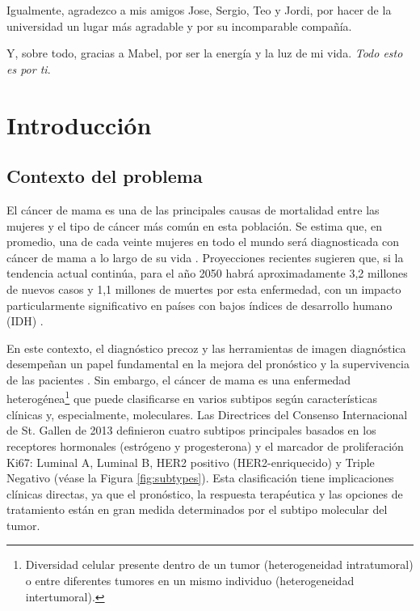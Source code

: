 \documentclass[a4paper,10pt]{book}
\begin{document}
Igualmente, agradezco a mis amigos Jose, Sergio, Teo y Jordi, por hacer de la universidad un lugar más agradable y por su incomparable compañía.

Y, sobre todo, gracias a Mabel, por ser la energía y la luz de mi vida. \textit{Todo esto es por ti}.

 \setcounter{page}{0}
\let\cleardoublepage\clearpage
\tableofcontents
\newpage \thispagestyle{empty}

\listoffigures
\listoftables


\pagestyle{fancy}
\newpage \thispagestyle{empty}


\mainmatter
\chapter{Introducción}
\section{Contexto del problema}

El cáncer de mama es una de las principales causas de mortalidad entre las mujeres y el tipo de cáncer más común en esta población. Se estima que, en promedio, una de cada veinte mujeres en todo el mundo será diagnosticada con cáncer de mama a lo largo de su vida \cite{kim_global_2025}. Proyecciones recientes sugieren que, si la tendencia actual continúa, para el año 2050 habrá aproximadamente 3,2 millones de nuevos casos y 1,1 millones de muertes por esta enfermedad, con un impacto particularmente significativo en países con bajos índices de desarrollo humano (IDH) \cite{kim_global_2025}.

En este contexto, el diagnóstico precoz y las herramientas de imagen diagnóstica desempeñan un papel fundamental en la mejora del pronóstico y la supervivencia de las pacientes \cite{wang_early_2017}. Sin embargo, el cáncer de mama es una enfermedad heterogénea\footnote{Diversidad celular presente dentro de un tumor (heterogeneidad intratumoral) o entre diferentes tumores en un mismo individuo (heterogeneidad intertumoral).} que puede clasificarse en varios subtipos según características clínicas y, especialmente, moleculares. Las Directrices del Consenso Internacional de St. Gallen de 2013 \cite{goldhirsch_personalizing_2013} definieron cuatro subtipos principales basados en los receptores hormonales (estrógeno y progesterona) y el marcador de proliferación Ki67: Luminal A, Luminal B, HER2 positivo (HER2-enriquecido) y Triple Negativo (véase la Figura \ref{fig:subtypes}). Esta clasificación tiene implicaciones clínicas directas, ya que el pronóstico, la respuesta terapéutica y las opciones de tratamiento están en gran medida determinados por el subtipo molecular del tumor.
\end{document}
